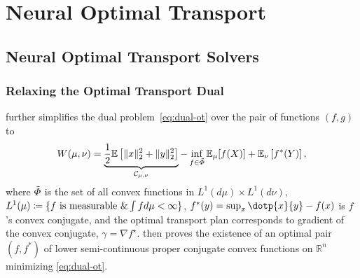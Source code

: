 \chapter{Neural Optimal Transport}
\label{cha:cellot}


%

\section{Neural Optimal Transport Solvers}


\subsection{Relaxing the Optimal Transport Dual}

\citet[Theorem 2.9]{villani2021topics} further simplifies the dual problem~\eqref{eq:dual-ot} over the pair of functions $(f, g)$ to
\begin{equation} \label{eq:dual-ot-cvx}
    W(\mu, \nu)= \underbrace{\frac{1}{2}\mathbb{E}\left[\|x\|_{2}^{2}+\|y\|_{2}^{2}\right]}_{\mathcal{C}_{\mu, \nu}}-\inf _{f \in \Tilde{\Phi}} \mathbb{E}_{\mu}[f(X)]+\mathbb{E}_{\nu}\left[f^{*}(Y)\right],
\end{equation}
where $\Tilde{\Phi}$ is the set of all convex functions in $L^1(d\mu) \times L^1(d\nu)$, $L^{1}(\mu) \coloneqq \{f \text{ is measurable } \& \int f d\mu<\infty\}$, $f^*(y) = \sup_x \dotp{x}{y} - f(x)$ is $f$'s convex conjugate, and the optimal transport plan corresponds to gradient of the convex conjugate, $\gamma = \nabla f^\star$. %
\citet[Theorem 2.9]{villani2021topics} then proves the existence of an optimal pair $(f, f^*)$ of lower semi-continuous proper conjugate convex functions on $\mathbb{R}^n$ minimizing \eqref{eq:dual-ot}.

